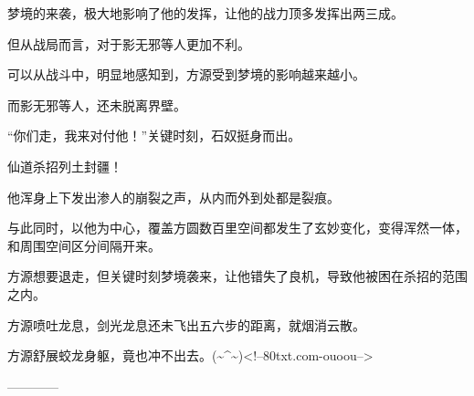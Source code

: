 \begin{this_body}
梦境的来袭，极大地影响了他的发挥，让他的战力顶多发挥出两三成。

但从战局而言，对于影无邪等人更加不利。

可以从战斗中，明显地感知到，方源受到梦境的影响越来越小。

而影无邪等人，还未脱离界壁。

“你们走，我来对付他！”关键时刻，石奴挺身而出。

仙道杀招列土封疆！

他浑身上下发出渗人的崩裂之声，从内而外到处都是裂痕。

与此同时，以他为中心，覆盖方圆数百里空间都发生了玄妙变化，变得浑然一体，和周围空间区分间隔开来。

方源想要退走，但关键时刻梦境袭来，让他错失了良机，导致他被困在杀招的范围之内。

方源喷吐龙息，剑光龙息还未飞出五六步的距离，就烟消云散。

方源舒展蛟龙身躯，竟也冲不出去。(\~{}\^{}\~{})<!--80txt.com-ouoou-->

------------

\end{this_body}

